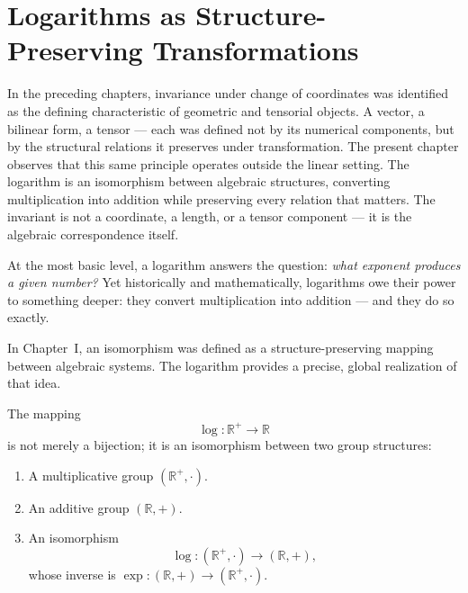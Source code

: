 \chapter{Logarithms as Structure-Preserving Transformations}

In the preceding chapters, invariance under change of coordinates was identified
as the defining characteristic of geometric and tensorial objects.
A vector, a bilinear form, a tensor --- each was defined not by its numerical
components, but by the structural relations it preserves under transformation.
The present chapter observes that this same principle operates outside the
linear setting.
The logarithm is an isomorphism between algebraic structures, converting
multiplication into addition while preserving every relation that matters.
The invariant is not a coordinate, a length, or a tensor component ---
it is the algebraic correspondence itself.


\medskip

At the most basic level, a logarithm answers the question:
\emph{what exponent produces a given number?}
Yet historically and mathematically,
logarithms owe their power to something deeper:
they convert multiplication into addition --- and they do so exactly.

\medskip

In Chapter~I, an isomorphism was defined as a structure-preserving mapping
between algebraic systems.
The logarithm provides a precise, global realization of that idea.

\medskip

The mapping
\[
\log:\mathbb{R}^+\to\mathbb{R}
\]
is not merely a bijection; it is an isomorphism between two group structures:

\begin{enumerate}
    \item A multiplicative group $(\mathbb{R}^+,\cdot)$.
    \item An additive group $(\mathbb{R},+)$.
    \item An isomorphism
    \[
    \log:(\mathbb{R}^+,\cdot)\longrightarrow(\mathbb{R},+),
    \]
    whose inverse is $\exp:(\mathbb{R},+)\to(\mathbb{R}^+,\cdot)$.
\end{enumerate}

